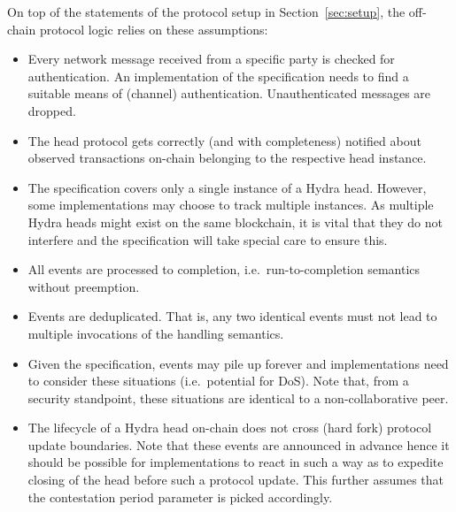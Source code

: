 On top of the statements of the protocol setup in Section~\ref{sec:setup}, the
off-chain protocol logic relies on these assumptions:
\begin{itemize}
  \item Every network message received from a specific party is checked for
        authentication. An implementation of the specification needs to find a
        suitable means of (channel) authentication. Unauthenticated messages are
        dropped.
  \item The head protocol gets correctly (and with completeness) notified about
        observed transactions on-chain belonging to the respective head
        instance.
  \item The specification covers only a single instance of a Hydra head.
        However, some implementations may choose to track multiple instances. As
        multiple Hydra heads might exist on the same blockchain, it is vital
        that they do not interfere and the specification will take special care
        to ensure this.
  \item All events are processed to completion, i.e.\ run-to-completion semantics
        without preemption.
  \item Events are deduplicated. That is, any two identical events must not lead
        to multiple invocations of the handling semantics.
  \item Given the specification, events may pile up forever and implementations
        need to consider these situations (i.e.\ potential for DoS). Note that,
        from a security standpoint, these situations are identical to a
        non-collaborative peer.
  \item The lifecycle of a Hydra head on-chain does not cross (hard fork)
        protocol update boundaries. Note that these events are announced in
        advance hence it should be possible for implementations to react in such
        a way as to expedite closing of the head before such a protocol update.
        This further assumes that the contestation period parameter is picked
        accordingly.
\end{itemize}

